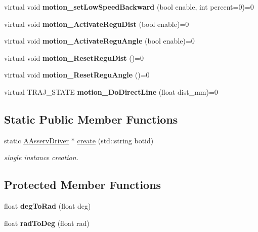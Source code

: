 \begin{DoxyCompactItemize}
virtual void {\bfseries motion\+\_\+set\+Low\+Speed\+Backward} (bool enable, int percent=0)=0
\item 
\mbox{\label{classAAsservDriver_a7a41963b5f908604a55f109e7ea3214e}} 
virtual void {\bfseries motion\+\_\+\+Activate\+Regu\+Dist} (bool enable)=0
\item 
\mbox{\label{classAAsservDriver_ae5b16fb3a46e690deb213b556749e33f}} 
virtual void {\bfseries motion\+\_\+\+Activate\+Regu\+Angle} (bool enable)=0
\item 
\mbox{\label{classAAsservDriver_a658d7dad992e6eb5066a396a8fbaf645}} 
virtual void {\bfseries motion\+\_\+\+Reset\+Regu\+Dist} ()=0
\item 
\mbox{\label{classAAsservDriver_a0426d6401a8fa5ff8489f9b040a616da}} 
virtual void {\bfseries motion\+\_\+\+Reset\+Regu\+Angle} ()=0
\item 
\mbox{\label{classAAsservDriver_a24fc4fe4bd8dae4d0658b5102f343657}} 
virtual T\+R\+A\+J\+\_\+\+S\+T\+A\+TE {\bfseries motion\+\_\+\+Do\+Direct\+Line} (float dist\+\_\+mm)=0
\end{DoxyCompactItemize}
\subsection*{Static Public Member Functions}
\begin{DoxyCompactItemize}
\item 
\mbox{\label{classAAsservDriver_aa8b144fdccac014af94b93f743d89fa8}} 
static \hyperlink{classAAsservDriver}{A\+Asserv\+Driver} $\ast$ \hyperlink{classAAsservDriver_aa8b144fdccac014af94b93f743d89fa8}{create} (std\+::string botid)
\begin{DoxyCompactList}\small\item\em single instance creation. \end{DoxyCompactList}\end{DoxyCompactItemize}
\subsection*{Protected Member Functions}
\begin{DoxyCompactItemize}
\item 
\mbox{\label{classAAsservDriver_a956b5f3a782e15931aa80fd834dd63e7}} 
float {\bfseries deg\+To\+Rad} (float deg)
\item 
\mbox{\label{classAAsservDriver_a231f237f4a38854b1cc70bc87636727e}} 
float {\bfseries rad\+To\+Deg} (float rad)
\end{DoxyCompactItemize}


